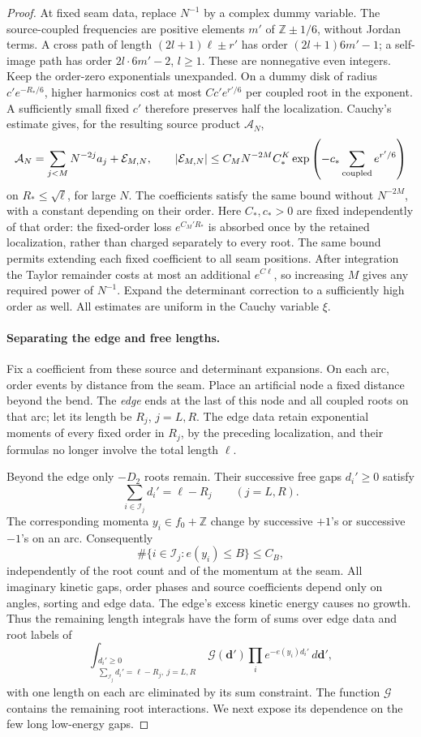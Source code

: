 \begin{proof}
At fixed seam data, replace \(N^{-1}\) by a complex dummy variable.
The source-coupled frequencies are positive elements \(m'\) of
\(\mathbb Z\pm1/6\), without Jordan terms. A cross path of length
\((2l+1)\ell\pm r'\) has order \((2l+1)6m'-1\); a self-image path
has order \(2l\cdot6m'-2\), \(l\ge1\). These are nonnegative even
integers. Keep the order-zero exponentials unexpanded. On a dummy disk
of radius \(c'e^{-R_*/6}\), higher harmonics cost at most
\(Cc'e^{r'/6}\) per coupled root in the exponent. A sufficiently
small fixed \(c'\) therefore preserves half the localization.
Cauchy's estimate gives, for the resulting source product
\(\mathcal A_N\),
\[
 \mathcal A_N=\sum_{j<M}N^{-2j}a_j+\mathcal E_{M,N},
 \qquad
 |\mathcal E_{M,N}|
 \le C_M N^{-2M} C_*^K
        \exp\left(-c_*\sum_{\rm coupled} e^{r'/6}\right)
\]
on \(R_*\le\sqrt\ell\), for large \(N\). The coefficients satisfy
the same bound without \(N^{-2M}\), with a constant depending on their
order. Here \(C_*,c_*>0\) are fixed independently of that order:
the fixed-order loss \(e^{C_M'R_*}\) is absorbed once by the retained
localization, rather than charged separately to every root. The same
bound permits extending each fixed coefficient to all seam positions.
After integration the Taylor remainder costs at most an additional
\(e^{C\ell}\), so increasing \(M\) gives any required power of
\(N^{-1}\). Expand the determinant correction to a sufficiently high
order as well. All estimates are uniform in the Cauchy variable \(\xi\).

\paragraph{Separating the edge and free lengths.}
Fix a coefficient from these source and determinant expansions. On each
arc, order events by distance from the seam. Place an artificial node a
fixed distance beyond the bend. The \emph{edge} ends at the last of
this node and all coupled roots on that arc; let its length be
\(R_j\), \(j=L,R\). The edge data retain exponential moments of
every fixed order in \(R_j\), by the preceding localization, and their
formulas no longer involve the total length \(\ell\).

Beyond the edge only \(-D_2\) roots remain. Their successive free gaps
\(d_i'\ge0\) satisfy
\[
 \sum_{i\in\mathcal I_j}d_i'=\ell-R_j
       \qquad (j=L,R).
\]
The corresponding momenta \(y_i\in f_0+\mathbb Z\) change by
successive \(+1\)'s or successive \(-1\)'s on an arc. Consequently
\[
 \#\{i\in\mathcal I_j:e(y_i)\le B\}\le C_B,
\]
independently of the root count and of the momentum at the seam.
All imaginary kinetic gaps, order phases and source coefficients depend
only on angles, sorting and edge data. The edge's excess kinetic energy
causes no growth. Thus the remaining length integrals have the form of
sums over edge data and root labels of
\[
 \int_{\substack{d_i'\ge0\\
       \sum_{\mathcal I_j}d_i'=\ell-R_j,\ j=L,R}}
       \mathcal G(\boldsymbol d')
       \prod_i e^{-e(y_i)d_i'}\,d\boldsymbol d',
\]
with one length on each arc eliminated by its sum constraint.
The function \(\mathcal G\) contains the remaining root interactions.
We next expose its dependence on the few long low-energy gaps.


\end{proof}
